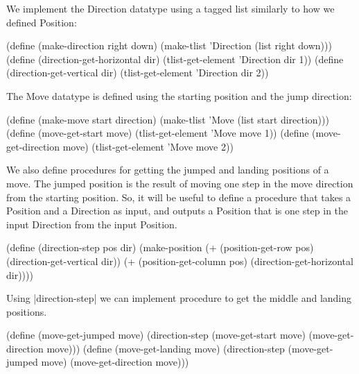 \begin{schemeregion}
{We implement the Direction datatype using a tagged list similarly to how we defined Position:

\begin{schemedisplay}
(define (make-direction right down)    
   (make-tlist 'Direction (list right down)))
(define (direction-get-horizontal dir) (tlist-get-element 'Direction dir 1))
(define (direction-get-vertical dir) (tlist-get-element 'Direction dir 2))
\end{schemedisplay}

The Move datatype is defined using the starting position and the jump direction:
\begin{schemedisplay}
(define (make-move start direction) 
   (make-tlist 'Move (list start direction)))
(define (move-get-start move) (tlist-get-element 'Move move 1))
(define (move-get-direction move) (tlist-get-element 'Move move 2))
\end{schemedisplay}
We also define procedures for getting the jumped and landing positions of a move.  The jumped position is the result of moving one step in the move direction from the starting position.  So, it will be useful to define a procedure that takes a Position and a Direction as input, and outputs a Position that is one step in the input Direction from the input Position.
\begin{schemedisplay}
(define (direction-step pos dir)
  (make-position 
    (+ (position-get-row pos) (direction-get-vertical dir))
    (+ (position-get-column pos) (direction-get-horizontal dir))))
\end{schemedisplay}
Using \scheme|direction-step| we can implement procedure to get the middle and landing positions.
\begin{schemedisplay}
(define (move-get-jumped move) 
  (direction-step (move-get-start move) (move-get-direction move)))
(define (move-get-landing move) 
  (direction-step (move-get-jumped move) (move-get-direction move)))
\end{schemedisplay}

}
\end{schemeregion}
